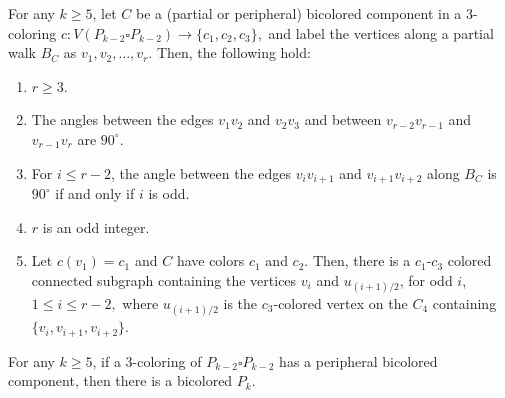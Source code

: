 \documentclass[10pt,a4paper]{amsart}
\begin{document}
\begin{lemma}\label{lem-angle}
For any $k\geq 5$, let $C$ be a (partial or peripheral) bicolored component in a 3-coloring $c: V(P_{k-2}\square P_{k-2})\to \{c_1,c_2,c_3\},$ and label the vertices along a partial walk $B_C$ as $v_1, v_2, \dots, v_r$.  
Then, the following hold:
\begin{enumerate}
    \item $r\geq 3$. 
    \item The angles between the edges $v_1v_2$ and $v_2v_3$ and between $v_{r-2}v_{r-1}$ and $v_{r-1}v_r$ are $90^{\circ}$.  
    \item For $i\leq r-2$, the angle between the edges $v_iv_{i+1}$ and $v_{i+1}v_{i+2}$ along $B_C$ is $90^{\circ}$ if and only if $i$ is odd. 
    \item $r$ is an odd integer.
    \item 
    Let $c(v_1)=c_1$ and $C$ have colors $c_1$ and $c_2.$ Then, 
    there is a $c_1$-$c_3$ colored connected subgraph containing the vertices $v_i$ and $u_{(i+1)/2}$, for odd $i$, $1\leq i\leq r-2,$ where $u_{(i+1)/2}$ is the $c_3$-colored vertex on the $C_4$ containing $\{v_i, v_{i+1},v_{i+2}\}.$
\end{enumerate}
\end{lemma}

\begin{lemma}\label{lem-case1}
    For any $k\geq 5$, if a 3-coloring of $P_{k-2}\square P_{k-2}$ has a peripheral bicolored component, then there is a bicolored $P_k$. 
\end{lemma}
\end{document}
